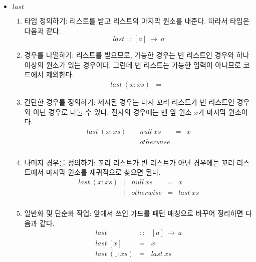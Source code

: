 \begin{itemize}
\item $last$
  \begin{enumerate}
  \item 타입 정의하기: 리스트를 받고 리스트의 마지막 원소를 내준다. 따라서
    타입은 다음과 같다.
    \[last~::~[a]~\rightarrow~a\]
  \item 경우를 나열하기: 리스트를 받으므로, 가능한 경우는 빈 리스트인 경우와
    하나 이상의 원소가 있는 경우이다. 그런데 빈 리스트는 가능한 입력이 아니므로
    코드에서 제외한다.
    \[\begin{array}{lcl}
      last~(x : xs) & = &
    \end{array}\]
  \item 간단한 경우를 정의하기: 제시된 경우는 다시 꼬리 리스트가 빈 리스트인
    경우와 아닌 경우로 나눌 수 있다. 전자의 경우에는 맨 앞 원소 $x$가 마지막
    원소이다.
    \[\begin{array}{lclcl}
      last~(x : xs) &|& null~xs   & = & x\\
                    &|& otherwise & = & \\
    \end{array}\]
  \item 나머지 경우를 정의하기: 꼬리 리스트가 빈 리스트가 아닌 경우에는 꼬리
    리스트에서 마지막 원소를 재귀적으로 찾으면 된다.
    \[\begin{array}{lclcl}
      last~(x : xs) &|&null~xs   & = & x\\
                    &|&otherwise & = & last~xs\\
    \end{array}\]
  \item 일반화 및 단순화 작업: 앞에서 쓰인 가드를 패턴 매칭으로 바꾸어
    정리하면 다음과 같다.
    \[\begin{array}{lcl}
      last & :: & [a]~\rightarrow~a \\
      last~[x]      & = & x \\
      last~(\_ : xs) & = & last~xs \\
    \end{array}\]
  \end{enumerate}
\end{itemize}


